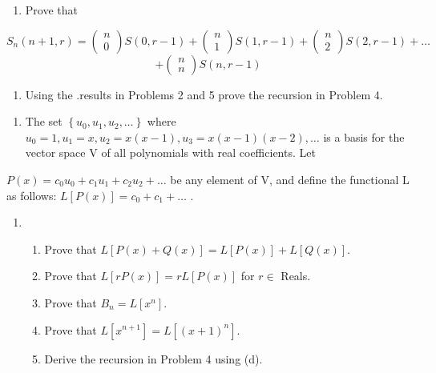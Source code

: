 \documentclass{article}
\begin{document}
\begin{enumerate}
\item Prove that
\end{enumerate}
\begin{equation*}
S_n\left(n+1,r\right)=\left(\begin{matrix}n\\0\end{matrix}\right)S\left(0,r-1\right)+\left(\begin{matrix}n\\1\end{matrix}\right)S\left(1,r-1\right)+\left(\begin{matrix}n\\2\end{matrix}\right)S\left(2,r-1\right)+{\dots}
\end{equation*}
\begin{equation*}
+\left(\begin{matrix}n\\n\end{matrix}\right)S(n,r-1)
\end{equation*}
\begin{enumerate}
\item Using the .results in Problems 2 and 5 prove the recursion in Problem 4. 
\end{enumerate}
\begin{enumerate}
\item The set  $\left\{u_0,u_1,u_2,{\dots}\right\}$ where 
$u_0=1,u_1=x,u_2=x\left(x-1\right),u_3=x\left(x-1\right)\left(x-2\right),{\dots}$ is a basis for the vector space V of
all polynomials with real coefficients. Let
\end{enumerate}
 $P\left(x\right)=c_0u_0+c_1u_1+c_2u_2+{\dots}$ be any element of V, and define the functional L as follows: 
$L\left[P\left(x\right)\right]=c_0+c_1+{\dots}$ .

\begin{enumerate}
\item \begin{enumerate}
\item Prove that 
$L\left[P\left(x\right)+Q\left(x\right)\right]=L\left[P\left(x\right)\right]+L\left[Q\left(x\right)\right].$
\item Prove that  $L\left[\mathit{rP}\left(x\right)\right]=\mathit{rL}[P\left(x\right)]$ for  $r{\in}$ Reals. 
\item Prove that  $B_n=L[x^n]$. 
\item Prove that  $L\left[x^{n+1}\right]=L[\left(x+1\right)^n]$.
\item Derive the recursion in Problem 4 using (d). 
\end{enumerate}
\end{enumerate}
\end{document}

